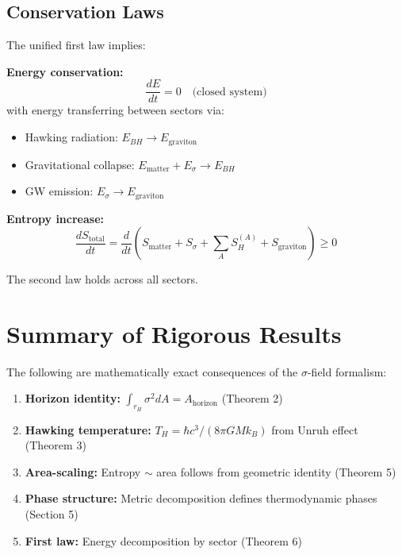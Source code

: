 \documentclass[11pt,a4paper]{article}
\theoremstyle{definition}
\theoremstyle{remark}
\begin{document}
	\subsection{Conservation Laws}
	
	The unified first law implies:
	
	\textbf{Energy conservation:}
	\begin{equation}
		\frac{dE}{dt} = 0 \quad \text{(closed system)}
	\end{equation}
	with energy transferring between sectors via:
	\begin{itemize}
		\item Hawking radiation: $E_{BH} \to E_{\text{graviton}}$
		\item Gravitational collapse: $E_{\text{matter}} + E_\sigma \to E_{BH}$
		\item GW emission: $E_\sigma \to E_{\text{graviton}}$
	\end{itemize}
	
	\textbf{Entropy increase:}
	\begin{equation}
		\frac{dS_{\text{total}}}{dt} = \frac{d}{dt}\left(S_{\text{matter}} + S_\sigma + \sum_A S_H^{(A)} + S_{\text{graviton}}\right) \geq 0
	\end{equation}
	
	The second law holds across all sectors.
	
	\section{Summary of Rigorous Results}
	
	The following are mathematically exact consequences of the $\sigma$-field formalism:
	
	\begin{enumerate}
		\item \textbf{Horizon identity:} $\int_{r_H} \sigma^2 dA = A_{\text{horizon}}$ (Theorem 2)
		
		\item \textbf{Hawking temperature:} $T_H = \hbar c^3/(8\pi GMk_B)$ from Unruh effect (Theorem 3)
		
		\item \textbf{Area-scaling:} Entropy $\sim$ area follows from geometric identity (Theorem 5)
		
		\item \textbf{Phase structure:} Metric decomposition defines thermodynamic phases (Section 5)
		
		\item \textbf{First law:} Energy decomposition by sector (Theorem 6)
	\end{enumerate}
	
\end{document}
